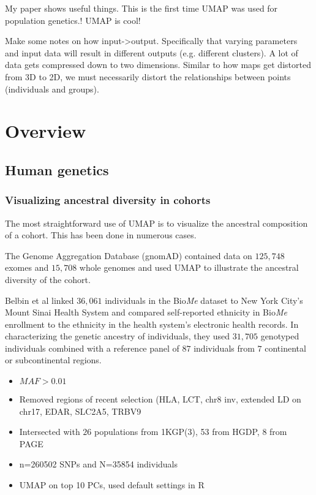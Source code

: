 \documentclass[12pt]{article}
\begin{document}
My paper shows useful things. This is the first time UMAP was used for population genetics.\cite{diaz-papkovich_umap_2019}! UMAP is cool! 

Make some notes on how input->output. Specifically that varying parameters and input data will result in different outputs (e.g. different clusters). A lot of data gets compressed down to two dimensions. Similar to how maps get distorted from 3D to 2D, we must necessarily distort the relationships between points (individuals and groups).


\section*{Overview}

\subsection*{Human genetics}

\subsubsection*{Visualizing ancestral diversity in cohorts}
The most straightforward use of UMAP is to visualize the ancestral composition of a cohort. This has been done in numerous cases.

The Genome Aggregation Database (gnomAD) contained data on $125,748$ exomes and $15,708$ whole genomes and used UMAP to illustrate the ancestral diversity of the cohort.\cite{karczewski_mutational_2020} 


Belbin et al\cite{belbin_towards_2019} linked $36,061$ individuals in the Bio\emph{Me} dataset to New York City's Mount Sinai Health System and compared self-reported ethnicity in Bio\emph{Me} enrollment to the ethnicity in the health system's electronic health records. In characterizing the genetic ancestry of individuals, they used $31,705$ genotyped individuals combined with a reference panel of $87$ individuals from $7$ continental or subcontinental regions.
\begin{itemize}
\item{$MAF > 0.01$}
\item{Removed regions of recent selection (HLA, LCT, chr8 inv, extended LD on chr17, EDAR, SLC2A5, TRBV9}
\item{Intersected with $26$ populations from 1KGP(3), 53 from HGDP, 8 from PAGE}
\item{n=260502 SNPs and N=35854 individuals}
\item{UMAP on top 10 PCs, used default settings in R}
\end{itemize}
\end{document}
